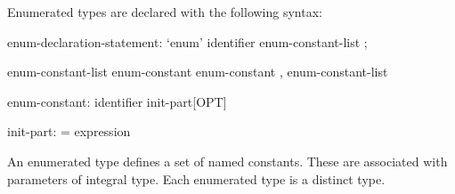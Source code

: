 Enumerated types are declared with the following syntax:
\begin{syntax}
enum-declaration-statement:
  `enum' identifier { enum-constant-list } ;

enum-constant-list
  enum-constant
  enum-constant , enum-constant-list

enum-constant:
  identifier init-part[OPT]

init-part:
  = expression
\end{syntax}

An enumerated type defines a set of named constants.  These are
associated with parameters of integral type.  Each enumerated type is
a distinct type.
